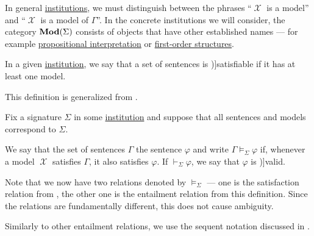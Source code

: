 \begin{remark}\label{rem:institutional_model_terminology}
  In general \hyperref[def:institution]{institutions}, we must distinguish between the phrases \enquote{\( \mscrX \) is a model} and \enquote{\( \mscrX \) is a model of \( \Gamma \)}. In the concrete institutions we will consider, the category \( \op*{Mod}(\Sigma) \) consists of objects that have other established names --- for example \hyperref[def:propositional_valuation/interpretation]{propositional interpretation} or \hyperref[def:first_order_structure]{first-order structures}.
\end{remark}

\begin{definition}\label{def:satisfiable_set_of_sentences}\mimprovised
   In a given \hyperref[def:institution]{institution}, we say that a set of sentences is \term[ru=совместное (\cite[def. 1.3.17]{Герасимов2011})]{satisfiable} if it has at least one model.
\end{definition}
\begin{comments}
  \item This definition is generalized from .
\end{comments}

\begin{definition}\label{def:institutional_entailment}
  Fix a signature \( \Sigma \) in some \hyperref[def:institution]{institution} and suppose that all sentences and models correspond to \( \Sigma \).

  We say that the set of sentences \( \Gamma \)  the sentence \( \varphi \) and write \( \Gamma \vDash_\Sigma \varphi \) if, whenever a model \( \mscrX \) satisfies \( \Gamma \), it also satisfies \( \varphi \). If \( \vdash_\Sigma \varphi \), we say that \( \varphi \) is \term[en=valid (\cite[def. 2.2.1]{Hinman2005})]{valid}.
\end{definition}
\begin{comments}
  \item Note that we now have two relations denoted by \( \vDash_\Sigma \) --- one is the satisfaction relation from , the other one is the entailment relation from this definition. Since the relations are fundamentally different, this does not cause ambiguity.

  \item Similarly to other entailment relations, we use the sequent notation discussed in .
\end{comments}

